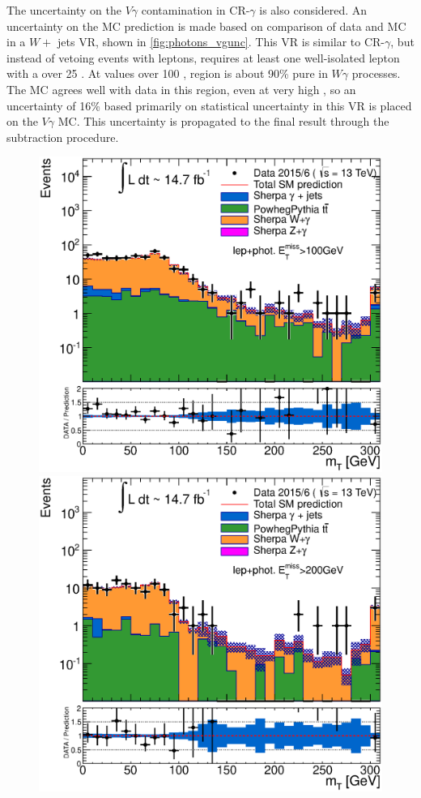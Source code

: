 The uncertainty on the $V\gamma$ contamination in CR-$\gamma$ is also considered. An uncertainty on the \ac{MC} prediction is made based on comparison of data and \ac{MC} in a $W +$ jets \ac{VR}, shown in \autoref{fig:photons_vgunc}. This \ac{VR} is similar to CR-$\gamma$, but instead of vetoing events with leptons, requires at least one well-isolated lepton with a \pt over 25 \gev. At \met values over 100 \gev, region is about 90\% pure in $W\gamma$ processes. The \ac{MC} agrees well with data in this region, even at very high \met, so an uncertainty of 16\% based primarily on statistical uncertainty in this \ac{VR} is placed on the $V\gamma$ \ac{MC}. This uncertainty is propagated to the final result through the subtraction procedure.

\begin{centering}
\begin{figure}[!hbt]
\myfloatalign
\includegraphics[width=.9\linewidth]{figures/photons/hPhotLep_mT_MET100_hist.eps}
\includegraphics[width=.9\linewidth]{figures/photons/hPhotLep_mT_MET200_hist.eps}

\end{figure}
\end{centering}
